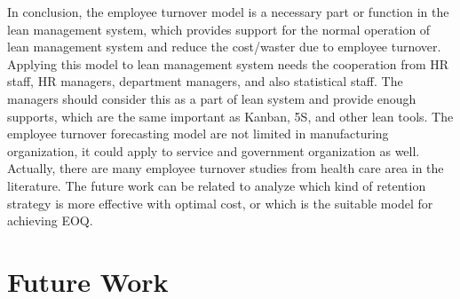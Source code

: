 In conclusion, the employee turnover model is a necessary part or function in the lean management system, which provides support for the normal operation of lean management system and reduce the cost/waster due to employee turnover. Applying this model to lean management system needs the cooperation from HR staff, HR managers, department managers, and also statistical staff. The managers should consider this as a part of lean system and provide enough supports, which are the same important as Kanban, 5S, and other lean tools. The employee turnover forecasting model are not limited in manufacturing organization, it could apply to service and government organization as well. Actually, there are many employee turnover studies from health care area in the literature. The future work can be related to analyze which kind of retention strategy is more effective with optimal cost, or which is the suitable model for achieving EOQ. 
\section{Future Work}
